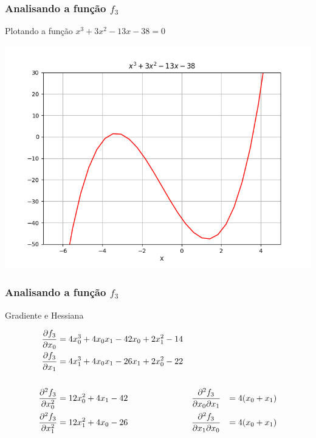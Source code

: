 \documentclass{beamer}
\begin{document}
\begin{frame}
\frametitle{Analisando a função $f_3$}

Plotando a função $x^3 + 3x^2 - 13x - 38 = 0$

\begin{center}
	\includegraphics[scale=0.5]{fig3.png}
\end{center}

\end{frame}

\begin{frame}
\frametitle{Analisando a função $f_3$}

Gradiente e Hessiana

\begin{align*}
	\frac{\partial f_3}{\partial x_0} &= 4 x_0^3 + 4 x_0 x_1 - 42 x_0 + 2 x_1^2 - 14 \\
	\frac{\partial f_3}{\partial x_1} &= 4 x_1^3 + 4 x_0 x_1 - 26 x_1 + 2 x_0^2 - 22 \\
	\vspace{1in} \\
	\frac{\partial^2 f_3}{\partial x_0^2} &= 12 x_0^2 + 4 x_1 - 42 && \frac{\partial^2 f_3}{\partial x_0 \partial x_1} &= 4(x_0 + x_1) \\
	\frac{\partial^2 f_3}{\partial x_1^2} &= 12 x_1^2 + 4 x_0 - 26 && \frac{\partial^2 f_3}{\partial x_1 \partial x_0} &= 4(x_0 + x_1)
\end{align*}

\end{frame}
\end{document}
